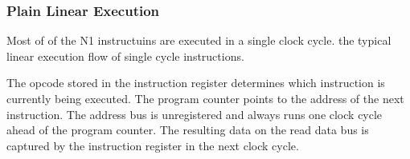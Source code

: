 \subsubsection{Plain Linear Execution}
\label{architecture:excyc:linear}

Most of of the  N1 instructuins are executed in a single clock cycle.
 the typical linear execution flow of single cycle instructions.

The opcode stored in the instruction register determines which instruction is currently being executed.
The program counter points to the address of the next instruction.
The address bus is unregistered and always runs one clock cycle ahead of the program counter. 
The resulting data on the read data bus is captured by the instruction register in the next clock cycle.

